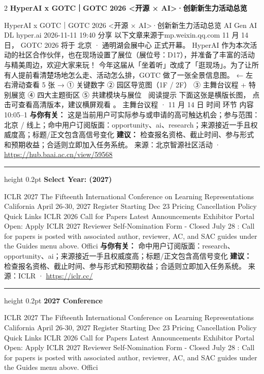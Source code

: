 \documentclass[10.5pt]{ctexart}
\begin{document}
\begin{multicols}{2}
{\large\bfseries HyperAI x GOTC｜GOTC 2026 <开源 × AI>·创新新生力活动总览}\par
HyperAI x GOTC｜GOTC 2026 <开源 × AI>·创新新生力活动总览 AI Gen AI DL hyper.ai 2026-11-11 19:40 分享 以下文章来源于mp.weixin.qq.com 11 月 14 日， GOTC 2026 将于 北京 · 通明湖会展中心 正式开幕。 HyperAI 作为本次活动的社区合作伙伴，也在现场设置了展位（展位号：D17），并准备了丰富的活动与精美周边，欢迎大家来玩！ 今年这届从「坐着听」改成了「逛现场」。为了让所有人提前看清楚场地怎么走、活动怎么排，GOTC 做了一张全景信息图。 ← 左右滑动查看 5 张 → ① 关键数字 ② 园区导览图（1F / 2F） ③ 主舞台议程 + 特别展览 ④ 四大主题街区 ⑤ 共建模块与展位 📱 阅读提示 下面这张是横版长图， 点击可查看高清版本，建议横屏观看 。 主舞台议程 · 11 月 14 日 时间 环节 内容 10:05–1
\textbf{与你有关：} 这是当前用户可实际参与或申请的高可触达机会；参与范围：北京 / 线上；命中用户订阅版面：opportunity、ai、research；来源接近一手且权威度高；标题/正文包含高信号变化
\textbf{建议：} 检查报名资格、截止时间、参与形式和预期收益；合适则立即加入任务系统。
{\footnotesize\color{ormuted} 来源：北京智源社区活动 · \url{https://hub.baai.ac.cn/view/59568}}
\vspace{2mm}
\hrule height 0.2pt
\vspace{2mm}
{\large\bfseries Select Year: (2027)}\par
ICLR 2027 The Fifteenth International Conference on Learning Representations California April 26-30, 2027 Register Starting Dec 23 Pricing Cancellation Policy Quick Links ICLR 2026 Call for Papers Latest Announcements Exhibitor Portal Open: Apply ICLR 2027 Reviewer Self-Nomination Form - Closed July 28 : Call for papers is posted with associated author, reviewer, AC, and SAC guides under the Guides menu above. Offici
\textbf{与你有关：} 命中用户订阅版面：research、opportunity、ai；来源接近一手且权威度高；标题/正文包含高信号变化
\textbf{建议：} 检查报名资格、截止时间、参与形式和预期收益；合适则立即加入任务系统。
{\footnotesize\color{ormuted} 来源：ICLR · \url{https://iclr.cc/}}
\vspace{2mm}
\hrule height 0.2pt
\vspace{2mm}
{\large\bfseries 2027 Conference}\par
ICLR 2027 The Fifteenth International Conference on Learning Representations California April 26-30, 2027 Register Starting Dec 23 Pricing Cancellation Policy Quick Links ICLR 2026 Call for Papers Latest Announcements Exhibitor Portal Open: Apply ICLR 2027 Reviewer Self-Nomination Form - Closed July 28 : Call for papers is posted with associated author, reviewer, AC, and SAC guides under the Guides menu above. Offici

\end{multicols}
\end{document}
